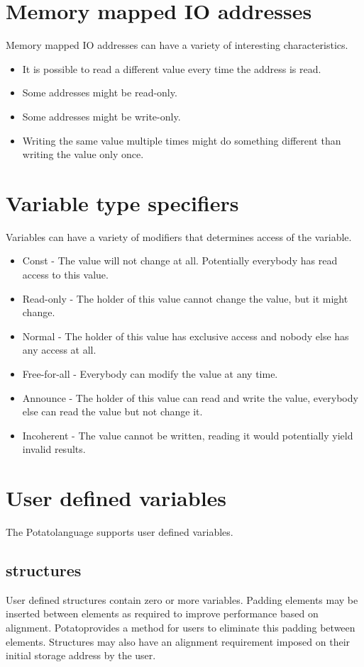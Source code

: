 \documentclass[12pt]{article}
\newcommand{\progLangNameSpace}{Potato\space }
\begin{document}
\section {Memory mapped IO addresses}

Memory mapped IO addresses can have a variety of interesting characteristics.

\begin{itemize}
\item It is possible to read a different value every time the address is read.
\item Some addresses might be read-only.
\item Some addresses might be write-only.
\item Writing the same value multiple times might do something different than writing the value only once.
\end{itemize}

\section {Variable type specifiers}

Variables can have a variety of modifiers that determines access of the variable.
\begin {itemize}
\item Const - The value will not change at all. Potentially everybody has read access to this value.
\item Read-only - The holder of this value cannot change the value, but it might change.
\item Normal - The holder of this value has exclusive access and nobody else has any access at all.
\item Free-for-all - Everybody can modify the value at any time.
\item Announce - The holder of this value can read and write the value, everybody else can read the value but not change it.
\item Incoherent - The value cannot be written, reading it would potentially yield invalid results.
\end {itemize}

\section {User defined variables}
The \progLangNameSpace language supports user defined variables.


\subsection {structures}
User defined structures contain zero or more variables. Padding elements may be inserted between elements as required to improve performance based on alignment. \progLangNameSpace provides a method for users to eliminate this padding between elements. Structures may also have an alignment requirement imposed on their initial storage address by the user.
\end{document}
